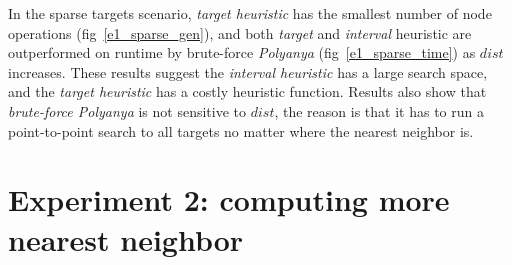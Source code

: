 In the sparse targets scenario, \textit{target heuristic} has the smallest number of node
operations (fig~\ref{e1_sparse_gen}), 
and both \textit{target} and \textit{interval} heuristic are outperformed on runtime by brute-force \textit{Polyanya} (fig~\ref{e1_sparse_time}) as $dist$ increases.
These results suggest the \textit{interval heuristic} has a large search space, and the
\textit{target heuristic} has a costly heuristic function. Results also show that \textit{brute-force Polyanya} is
not sensitive to $dist$, the reason is that it has to run a point-to-point search to all
targets no matter where the nearest neighbor is. 

\section{Experiment 2: computing more nearest neighbor}\label{exp2}
